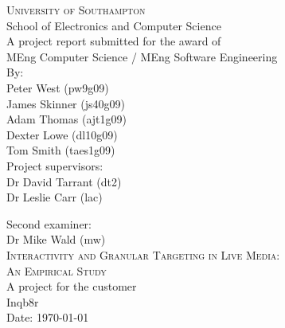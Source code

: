 
\begin{titlepage}

\begin{center}

\textsc{\large{University of Southampton}}\\[0.0cm]

\large{School of Electronics and Computer Science}\\[2.0cm]

\large{A project report submitted for the award of}\\[0.0cm]

\large{MEng Computer Science / MEng Software Engineering}\\[2.0cm]

\large{
	By: \\
	Peter West (pw9g09) \\
	James Skinner (js40g09) \\
	Adam Thomas (ajt1g09) \\
	Dexter Lowe (dl10g09) \\
	Tom Smith (taes1g09)}\\[2.0cm]

\large{Project supervisors: \\
		Dr David Tarrant (dt2) \\
		Dr Leslie Carr (lac)}

\large{Second examiner: \\
		Dr Mike Wald (mw)}\\[2.0cm]


\textsc{\large Interactivity and Granular Targeting in Live Media: \\
		An Empirical Study}\\[2.0cm]

\large{A project for the customer \\
		Inqb8r}\\[2.0cm]

\large{Date: \today}\\[4.0cm]

\end{center}

\end{titlepage}

